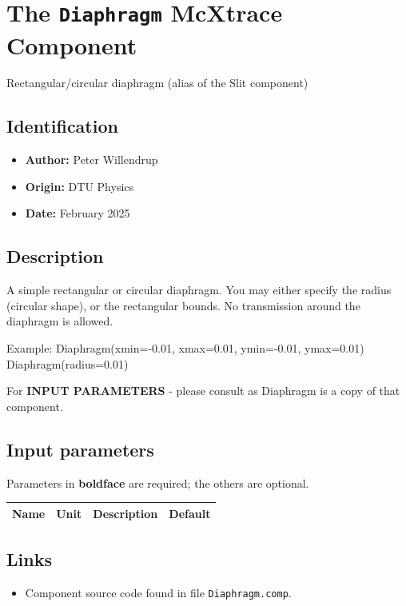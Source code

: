 \section{The \texttt{Diaphragm} McXtrace Component}
Rectangular/circular diaphragm (alias of the Slit component)

\subsection*{Identification}
\begin{itemize}
  \item \textbf{Author:} Peter Willendrup
  \item \textbf{Origin:} DTU Physics
  \item \textbf{Date:} February 2025
\end{itemize}

\subsection*{Description}
A simple rectangular or circular diaphragm. You may either specify the radius (circular shape), or the rectangular bounds. No transmission around the diaphragm is allowed.

Example: Diaphragm(xmin=-0.01, xmax=0.01, ymin=-0.01, ymax=0.01) Diaphragm(radius=0.01)

For \textbf{INPUT PARAMETERS} - please consult  as Diaphragm is a copy of that component.

\subsection*{Input parameters}
Parameters in \textbf{boldface} are required; the others are optional.

\begin{longtable}{p{}p{}p{}p{}}
\toprule
\textbf{Name} & \textbf{Unit} & \textbf{Description} & \textbf{Default} \\
\midrule
\endhead
\bottomrule
\end{longtable}

\subsection*{Links}
\begin{itemize}
  \item Component source code found in file \texttt{Diaphragm.comp}.
\end{itemize}
